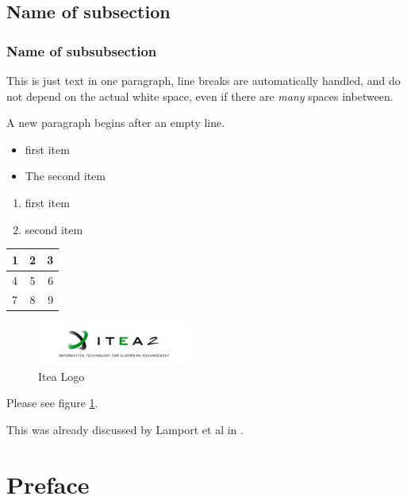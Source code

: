 \documentclass{template/openetcs_article_nocc}
\begin{document}
\subsection{Name of subsection}
\subsubsection{Name of subsubsection}

This is just text in one paragraph, line breaks are automatically handled, and do not depend on the actual
white
space, even if there are \emph{many}                                  spaces                            inbetween.

A new paragraph begins after an empty line.

\begin{itemize}
  \item first item
  \item The second item
\end{itemize}

\begin{enumerate}
  \item first item
  \item second item
\end{enumerate}

  \begin{tabular}{|  l | c || r | }
    \hline
    1 & 2 & 3 \\ \hline
    4 & 5 & 6 \\ \hline
    7 & 8 & 9 \\
    \hline
  \end{tabular}

\begin{figure}
  \centering
  \includegraphics[width=2in]{template/itea}
  \caption{Itea Logo}
  \label{fig:itea2}
\end{figure}

Please see figure \ref{fig:itea2}.

This was already discussed by Lamport et al in \cite{lamport94}.





\section{Preface}
\lipsum[1-5]
\end{document}
